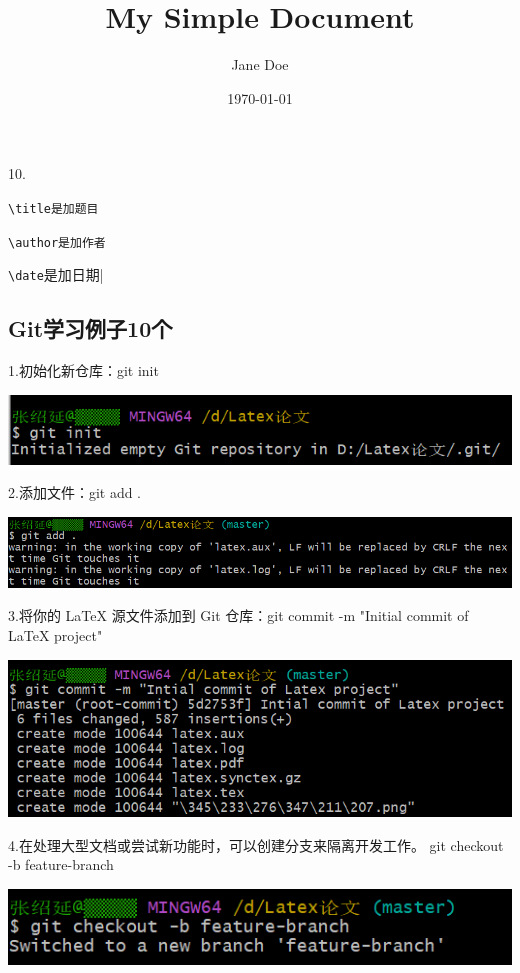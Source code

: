 \documentclass{article}
\begin{document}
10.
\title{My Simple Document} \verb|\title是加题目|

\author{Jane Doe}\verb|\author是加作者|

\date{\today}\verb|\date|是加日期|




\subsection{Git学习例子10个}
1.初始化新仓库：git init

\noindent
\begin{minipage}{\linewidth}
  \centering
  \includegraphics[width=0.5\linewidth]{git1.png}
  \label{fig:example}
\end{minipage}


2.添加文件：git add .


\noindent
\begin{minipage}{\linewidth}
  \centering
  \includegraphics[width=0.5\linewidth]{git2.png}
  \label{fig:example}
\end{minipage}

3.将你的 LaTeX 源文件添加到 Git 仓库：git commit -m "Initial commit of LaTeX project"

\noindent
\begin{minipage}{\linewidth}
  \centering
  \includegraphics[width=0.5\linewidth]{git3.png}
  \label{fig:example}
\end{minipage}

4.在处理大型文档或尝试新功能时，可以创建分支来隔离开发工作。
git checkout -b feature-branch

\noindent
\begin{minipage}{\linewidth}
 \centering
  \includegraphics[width=0.5\linewidth]{git4.png}
  \label{fig:example}
\end{minipage}
\end{document}
